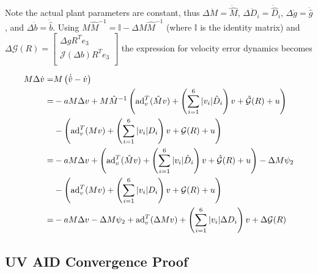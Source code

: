 Note the actual plant parameters are constant, thus
$\Delta \dot{M}=\dot{\hat{M}}$, $\Delta \dot{D}_i=\dot{\hat{D}}_i$,
$\Delta \dot{g}=\dot{\hat{g}}$, and $\Delta \dot{b}=\dot{\hat{b}}$.  
Using $ M \hat{M}^{-1}= \mathbb{I} -\Delta M \hat{M}^{-1}$ (where
$\mathbb{I}$ is the identity matrix) and $\Delta\mathcal{G}(R)=
\left[ \begin{array}{c}\Delta g R^T e_3 \\ \mathcal{J}(\Delta b)R^T
    e_3 \\ \end{array}\right]$ the expression for velocity error
dynamics becomes

\begin{align}\label{chUV_AID.eq.UV_SE3_Mdeltavdot}
M\Delta \dot{v}
 =&M\left(\dot{\hat{v}} - \dot{v}\right)
\nonumber \\
 =&-a M \Delta v
  +M \hat{M}^{-1}\left( \operatorname{ad}_v^T(\hat{M}v)
  +\left(\sum_{i=1}^6 |v_i|\hat{D}_i\right) v + 
  \hat{\mathcal{G}}(R)+u\right)  
\nonumber \\
  &-\left(\operatorname{ad}_v^T(M v)+\left(\sum_{i=1}^6 |v_i|D_i
    \right)v+\mathcal{G}(R)+u\right)
\nonumber \\
=&-a M \Delta v   
 +\left( \operatorname{ad}_v^T(\hat{M}v)
  +\left(\sum_{i=1}^6 |v_i|\hat{D}_i\right) v + 
  \hat{\mathcal{G}}(R)+u\right)
  -\Delta M \psi_2  
\nonumber \\
  &-\left(\operatorname{ad}_v^T(M v)+\left(\sum_{i=1}^6 |v_i|D_i
    \right)v+\mathcal{G}(R)+u\right)
\nonumber \\ 
=&-a M \Delta v-\Delta M \psi_2+\operatorname{ad}_v^T(\Delta M v)
 +\left(\sum_{i=1}^6 |v_i|\Delta D_i\right) v + 
  \Delta \mathcal{G} (R)
\end{align}


\subsection{\ac{UV} \ac{AID} Convergence Proof}\label{chUV_AID.sec.UV_SE3_proof}
\label{chUV_AID.sec.UVSE3_AID_convProof}

